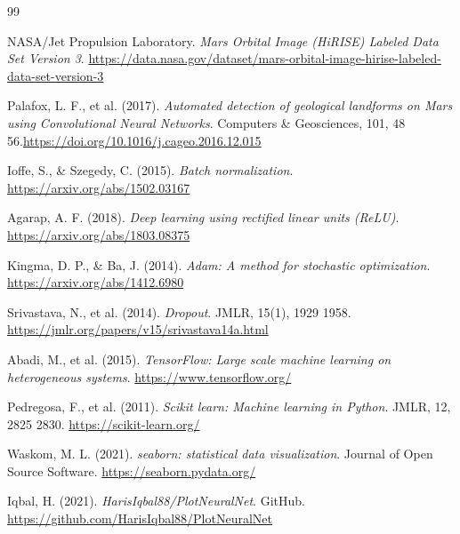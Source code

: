 \documentclass[11pt,a4paper]{article}
\begin{document}
\begin{thebibliography}{99}
\small
\setlength{\itemsep}{-1pt}
\setlength{\parskip}{0pt}

NASA/Jet Propulsion Laboratory. \textit{Mars Orbital Image (HiRISE) Labeled Data Set Version 3}. \url{https://data.nasa.gov/dataset/mars-orbital-image-hirise-labeled-data-set-version-3}

Palafox, L. F., et al. (2017). \textit{Automated detection of geological landforms on Mars using Convolutional Neural Networks}. Computers \& Geosciences, 101, 48 56.\url{https://doi.org/10.1016/j.cageo.2016.12.015}

Ioffe, S., \& Szegedy, C. (2015). \textit{Batch normalization}. \url{https://arxiv.org/abs/1502.03167}

Agarap, A. F. (2018). \textit{Deep learning using rectified linear units (ReLU)}. \url{https://arxiv.org/abs/1803.08375}

Kingma, D. P., \& Ba, J. (2014). \textit{Adam: A method for stochastic optimization}. \url{https://arxiv.org/abs/1412.6980}

Srivastava, N., et al. (2014). \textit{Dropout}. JMLR, 15(1), 1929 1958. \url{https://jmlr.org/papers/v15/srivastava14a.html}

Abadi, M., et al. (2015). \textit{TensorFlow: Large scale machine learning on heterogeneous systems}. \url{https://www.tensorflow.org/}

Pedregosa, F., et al. (2011). \textit{Scikit learn: Machine learning in Python}. JMLR, 12, 2825 2830. \url{https://scikit-learn.org/}

Waskom, M. L. (2021). \textit{seaborn: statistical data visualization}. Journal of Open Source Software. \url{https://seaborn.pydata.org/}

Iqbal, H. (2021). \textit{HarisIqbal88/PlotNeuralNet}. GitHub. \url{https://github.com/HarisIqbal88/PlotNeuralNet}

\end{thebibliography}
\end{document}

